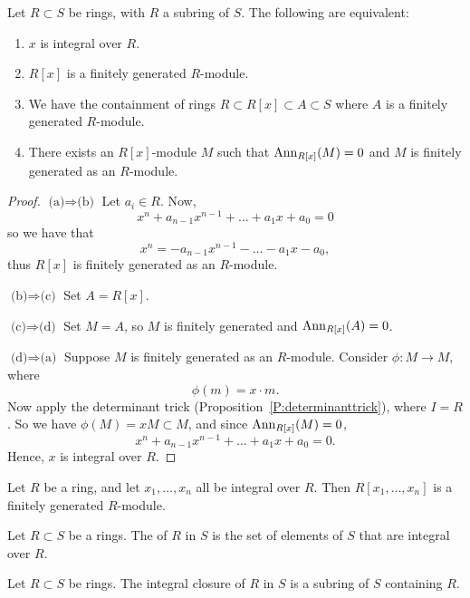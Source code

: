 \documentclass{ximera}
\begin{document}
\begin{proposition}
  Let $R\subset S$ be rings, with $R$ a subring of $S$. The following are equivalent:
  \begin{enumerate}
  \item $x$ is integral over $R$.
  \item $R[x]$ is a finitely generated $R$-module.
  \item We have the containment of rings $R\subset R[x] \subset
    A\subset S$ where $A$ is a finitely generated $R$-module.
  \item There exists an $R[x]$-module $M$ such that $\operatorname{Ann}_{R[x]}(M) =
    0$ and $M$ is finitely generated as an $R$-module.
  \end{enumerate}
  \begin{proof}
    $\text{(a)}\Rightarrow \text{(b)}$ Let $a_i\in R$. Now, 
    \[
    x^n + a_{n-1} x^{n-1} + \dots + a_1 x + a_0  = 0
    \]
    so we have that
    \[
    x^n = - a_{n-1} x^{n-1} - \dots - a_1 x - a_0,
    \] 
    thus $R[x]$ is finitely generated as an $R$-module.

    
    $\text{(b)}\Rightarrow \text{(c)}$ Set $A=R[x]$.


    $\text{(c)}\Rightarrow \text{(d)}$ Set $M=A$, so $M$ is finitely
    generated and $\operatorname{Ann}_{R[x]}(A)=0$.


    $\text{(d)}\Rightarrow \text{(a)}$ Suppose $M$ is finitely
    generated as an $R$-module. Consider $\phi:M \to M$, where
    \[
    \phi(m) = x\cdot m.
    \]
    Now apply the determinant trick (Proposition~\ref{P:determinanttrick}), where $I= R$. So
    we have $\phi(M) = xM \subset M$, and since $\operatorname{Ann}_{R[x]}(M) = 0$,
    \[
    x^n+ a_{n-1}x^{n-1} + \dots + a_1 x  + a_0 = 0.
    \]
    Hence, $x$ is integral over $R$.
  \end{proof}
\end{proposition}


\begin{corollary}
  Let $R$ be a ring, and let $x_1,\dots,x_n$ all be integral over
  $R$. Then $R[x_1,\dots,x_n]$ is a finitely generated $R$-module.
\end{corollary}

\begin{definition}
  Let $R\subset S$ be a rings. The  of $R$ in
  $S$ is the set of elements of $S$ that are integral over $R$. 
\end{definition}

\begin{corollary}
  Let $R\subset S$ be rings. The integral closure of $R$ in $S$ is a
  subring of $S$ containing $R$.
\end{corollary}
\end{document}
